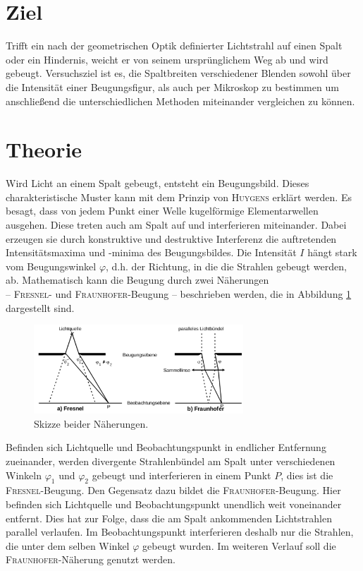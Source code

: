 \section{Ziel}
\label{sec:Ziel}
Trifft ein nach der geometrischen Optik definierter Lichtstrahl auf einen Spalt oder ein Hindernis, weicht er von seinem ursprünglichem Weg ab und wird gebeugt.
Versuchsziel ist es, die Spaltbreiten verschiedener Blenden sowohl über die Intensität einer Beugungsfigur, als auch per Mikroskop zu bestimmen um anschließend die unterschiedlichen Methoden miteinander vergleichen zu können.


\section{Theorie}
\label{sec:Theorie}
Wird Licht an einem Spalt gebeugt, entsteht ein Beugungsbild. Dieses charakteristische Muster kann mit dem Prinzip von \textsc{Huygens} erklärt werden. 
Es besagt, dass von jedem Punkt einer Welle kugelförmige Elementarwellen ausgehen. 
Diese treten auch am Spalt auf und interferieren miteinander.
Dabei  erzeugen sie durch konstruktive und destruktive Interferenz die auftretenden Intensitätsmaxima und -minima des Beugungsbildes.
Die Intensität $I$ hängt stark vom Beugungswinkel $\varphi$, d.h. der Richtung, in die die Strahlen gebeugt werden, ab.
Mathematisch kann die Beugung durch zwei Näherungen \\ -- \textsc{Fresnel}- und \textsc{Fraunhofer}-Beugung -- beschrieben werden, die in Abbildung \ref{fig:naeherung} dargestellt sind.

\begin{figure}
	\centering
	\includegraphics[width=0.7\textwidth]{Bilder/Naeherungen.pdf}
	\caption{Skizze beider Näherungen.\cite{V406}}
	\label{fig:naeherung}
\end{figure}

Befinden sich Lichtquelle und Beobachtungspunkt in endlicher Entfernung zueinander, werden divergente Strahlenbündel am Spalt unter verschiedenen Winkeln $\varphi_1$ und $\varphi_2$ gebeugt und interferieren in einem Punkt $P$, dies ist die \textsc{Fresnel}-Beugung.
Den Gegensatz dazu bildet die \textsc{Fraunhofer}-Beugung. Hier befinden sich Lichtquelle und Beobachtungspunkt unendlich weit voneinander entfernt. 
Dies hat zur Folge, dass die am Spalt ankommenden Lichtstrahlen parallel verlaufen. 
Im Beobachtungspunkt interferieren deshalb nur die Strahlen, die unter dem selben Winkel $\varphi$ gebeugt wurden. 
Im weiteren Verlauf soll die \textsc{Fraunhofer}-Näherung genutzt werden.



